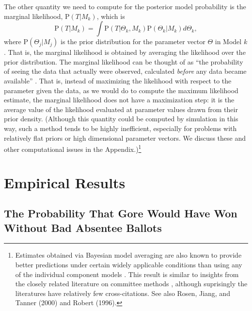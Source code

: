 \documentclass[11pt,titlepage]{article}
\renewcommand{\P}{\text{P}}
\begin{document}
The other quantity we need to compute for the posterior model
probability is the marginal likelihood, $\P(T|M_k)$, which is
\begin{equation}
  \P(T|M_k) = \int \P(T|\Theta_k, M_k) \P(\Theta_k|M_k) d\Theta_k,
  \label{eq:marglik}
\end{equation} 
where $\P(\Theta_j|M_j)$ is the prior distribution for the parameter
vector $\Theta$ in Model $k$. That is, the marginal likelihood is
obtained by averaging the likelihood over the prior distribution.  The
marginal likelihood can be thought of as ``the probability of seeing
the data that actually were observed, calculated \emph{before} any
data became available'' \cite[p.776]{kass:raft:95}.  That is, instead
of maximizing the likelihood with respect to the parameter given the
data, as we would do to compute the maximum likelihood estimate, the
marginal likelihood does not have a maximization step: it is the
average value of the likelihood evaluated at parameter values drawn
from their prior density.  (Although this quantity could be computed
by simulation in this way, such a method tends to be highly
inefficient, especially for problems with relatively flat priors or
high dimensional parameter vectors.  We discuss these and other
computational issues in the Appendix.)\footnote{Estimates obtained via
  Bayesian model averaging are also known to provide better
  predictions under certain widely applicable conditions than using
  any of the individual component models \citep{madi:raft:94}.  This
  result is similar to insights from the closely related literature on
  committee methods \citep{bish:95}, although suprisingly the
  literatures have relatively few cross-citations.  See also Rosen,
  Jiang, and Tanner (2000) and Robert
  (1996)\nocite{rose:jian:tann:00,robe:96a}.}

\section{Empirical Results}
\label{s:outcome}

\subsection{The Probability That Gore Would Have Won Without Bad 
Absentee Ballots}
\end{document}
